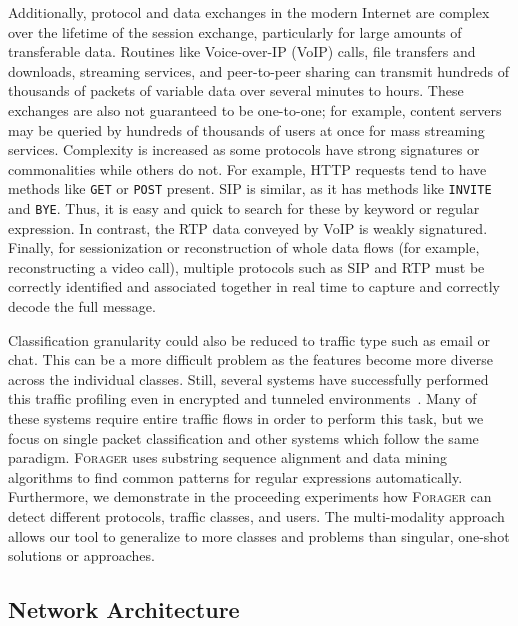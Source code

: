 Additionally, protocol and data exchanges in the modern Internet are complex over the lifetime of the session exchange, particularly for large amounts of transferable data. Routines like Voice-over-IP (VoIP) calls, file transfers and downloads, streaming services, and peer-to-peer sharing can transmit hundreds of thousands of packets of variable data over several minutes to hours. These exchanges are also not guaranteed to be one-to-one; for example, content servers may be queried by hundreds of thousands of users at once for mass streaming services. Complexity is increased as some protocols have strong signatures or commonalities while others do not. For example, HTTP requests tend to have methods like \texttt{GET} or \texttt{POST} present. SIP is similar, as it has methods like \texttt{INVITE} and \texttt{BYE}. Thus, it is easy and quick to search for these by keyword or regular expression. In contrast, the RTP data conveyed by VoIP is weakly signatured. Finally, for sessionization or reconstruction of whole data flows (for example, reconstructing a video call), multiple protocols such as SIP and RTP must be correctly identified and associated together in real time to capture and correctly decode the full message.

Classification granularity could also be reduced to traffic type such as email or chat. This can be a more difficult problem as the features become more diverse across the individual classes. Still, several systems have successfully performed this traffic profiling even in encrypted and tunneled environments~\cite{iscx-tor-paper, iscx-vpn-paper, deeppacket, didarknet}. Many of these systems require entire traffic flows in order to perform this task, but we focus on single packet classification and other systems which follow the same paradigm. \textsc{Forager} uses substring sequence alignment and data mining algorithms to find common patterns for regular expressions automatically. Furthermore, we demonstrate in the proceeding experiments how \textsc{Forager} can detect different protocols, traffic classes, and users. The multi-modality approach allows our tool to generalize to more classes and problems than singular, one-shot solutions or approaches.

\subsection{Network Architecture}

